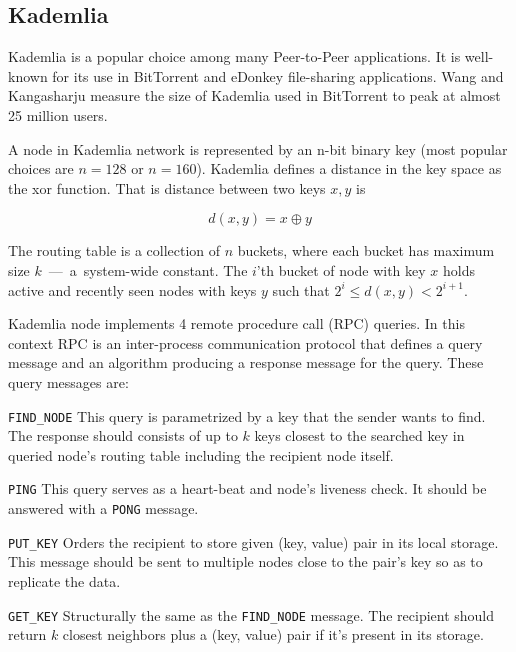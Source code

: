   \subsection{Kademlia}
  Kademlia \cite{may02} is a popular choice among many Peer-to-Peer
  applications. It is well-known for its use in BitTorrent and eDonkey
  file-sharing applications. Wang and Kangasharju \cite{wan13} measure the size
  of Kademlia used in BitTorrent to peak at almost 25 million users.

  A node in Kademlia network is represented by an n-bit binary key (most popular
  choices are $n = 128$ or $n = 160$). Kademlia defines a distance in the
  key space as the xor function. That is distance between two keys $x, y$ is

  \[ d(x, y) = x \oplus y\]

  The routing table is a collection of $n$ buckets, where each bucket has
  maximum size $k$~---~a~\mbox{system-wide} constant. 
  The $i$'th bucket of node with key $x$ holds active and recently seen nodes
  with keys $y$ such that $2^i \leq d(x, y) < 2^{i+1}$.

  Kademlia node implements 4 remote procedure call (RPC) queries. In this
  context RPC is an inter-process communication protocol that defines a query
  message and an algorithm producing a response message for the query. These
  query messages are:

  \begin{description}
    \item{\texttt{FIND\_NODE}} This query is parametrized by a key that the sender
      wants to find. The response should consists of up to $k$ keys closest to
      the searched key in queried node's routing table including the recipient
      node itself.
    \item{\texttt{PING}} This query serves as a heart-beat and node's liveness
      check. It should be answered with a \texttt{PONG} message.
    \item{\texttt{PUT\_KEY}} Orders the recipient to store given (key, value) pair
      in its local storage. This message should be sent to multiple nodes close
      to the pair's key so as to replicate the data.
    \item{\texttt{GET\_KEY}} Structurally the same as the \texttt{FIND\_NODE}
      message. The recipient should return $k$ closest neighbors plus a (key,
      value) pair if it's present in its storage.
  \end{description}

